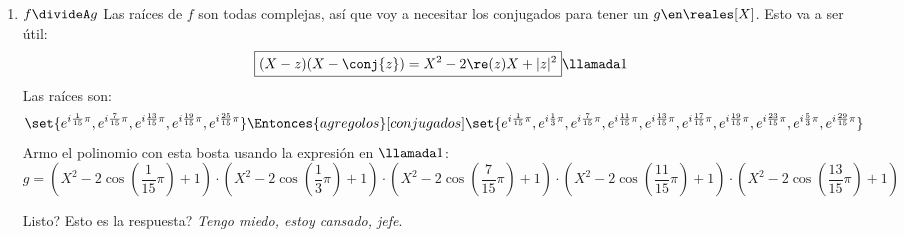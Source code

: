\begin{enumerate}[label=\alph*)]
	\item $f \divideA g$
	      Las raíces de $f$ son todas complejas, así que voy a necesitar los conjugados para tener un $g \en \reales[X]$.
	      Esto va a ser útil:
	      $$
		      \boxed{
			      (X - z)(X- \conj{z})
			      =
			      X^2 - 2\re(z)X + |z|^2
		      }\llamada1
	      $$
	      Las raíces son:
	      $$
		      \set{
			      e^{i \frac{1}{15} \pi},
			      e^{i \frac{7}{15} \pi},
			      e^{i \frac{13}{15} \pi},
			      e^{i \frac{19}{15} \pi},
			      e^{i \frac{25}{15} \pi}
		      }
		      \Entonces{agrego los}[conjugados]
		      \set{
			      e^{i \frac{1}{15} \pi},
			      e^{i \frac{1}{3} \pi},
			      e^{i \frac{7}{15} \pi},
			      e^{i \frac{11}{15} \pi},
			      e^{i \frac{13}{15} \pi},
			      e^{i \frac{17}{15} \pi},
			      e^{i \frac{19}{15} \pi},
			      e^{i \frac{23}{15} \pi},
			      e^{i \frac{5}{3} \pi},
			      e^{i \frac{29}{15} \pi}
		      }
	      $$
	      Armo el polinomio con esta bosta usando la expresión en $\llamada1$:
	      $$
		      \scriptstyle
		      g =
		      (X^2 -2\cos(\frac{1}{15}\pi) + 1) \cdot
		      (X^2 -2\cos(\frac{1}{3}\pi) + 1) \cdot
		      (X^2 -2\cos(\frac{7}{15}\pi) + 1) \cdot
		      (X^2 -2\cos(\frac{11}{15}\pi) + 1) \cdot
		      (X^2 -2\cos(\frac{13}{15}\pi) + 1)
	      $$

	      Listo? Esto es la respuesta? \textit{Tengo miedo, estoy cansado, jefe}.

\end{enumerate}

\begin{aportes}
	\item {}
\end{aportes}
